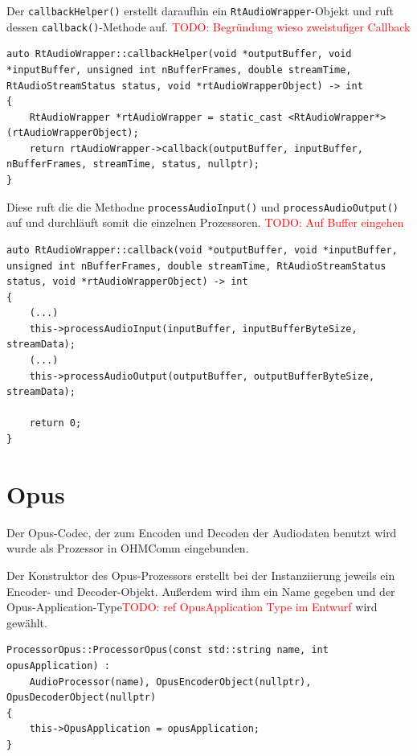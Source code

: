 Der \texttt{callbackHelper()} erstellt daraufhin ein \texttt{RtAudioWrapper}-Objekt und ruft dessen \texttt{callback()}-Methode auf. \textcolor{red}{TODO: Begründung wieso zweistufiger Callback}

\begin{lstlisting}[caption={\texttt{callbackHelper()}-Methode im RtAudioWrapper},label={Code:RtAudio}]
auto RtAudioWrapper::callbackHelper(void *outputBuffer, void *inputBuffer, unsigned int nBufferFrames, double streamTime, RtAudioStreamStatus status, void *rtAudioWrapperObject) -> int
{
    RtAudioWrapper *rtAudioWrapper = static_cast <RtAudioWrapper*> (rtAudioWrapperObject);
    return rtAudioWrapper->callback(outputBuffer, inputBuffer, nBufferFrames, streamTime, status, nullptr);
}
\end{lstlisting}

Diese ruft die  die Methodne \texttt{processAudioInput()} und \texttt{processAudioOutput()} auf und durchläuft somit die einzelnen Prozessoren. \textcolor{red}{TODO: Auf Buffer eingehen}

\begin{lstlisting}[caption={callback Methode im RtAudioWrapper},label={Code:RtAudio}]
auto RtAudioWrapper::callback(void *outputBuffer, void *inputBuffer, unsigned int nBufferFrames, double streamTime, RtAudioStreamStatus status, void *rtAudioWrapperObject) -> int
{
	(...)
	this->processAudioInput(inputBuffer, inputBufferByteSize, streamData);
	(...)
	this->processAudioOutput(outputBuffer, outputBufferByteSize, streamData);
	
	return 0;
}
\end{lstlisting}

\section{Opus}

Der Opus-Codec, der zum Encoden und Decoden der Audiodaten benutzt wird wurde als Prozessor in OHMComm eingebunden.

Der Konstruktor des Opus-Prozessors erstellt bei der Instanziierung jeweils ein Encoder- und Decoder-Objekt. Außerdem wird ihm ein Name gegeben und der Opus-Application-Type\textcolor{red}{TODO: ref OpusApplication Type im Entwurf} wird gewählt.

\begin{lstlisting}[caption={Instanziierung des Opus Prozessors},label={Code:Opus}]
ProcessorOpus::ProcessorOpus(const std::string name, int opusApplication) : 
    AudioProcessor(name), OpusEncoderObject(nullptr), OpusDecoderObject(nullptr)
{
    this->OpusApplication = opusApplication;
}
\end{lstlisting}

